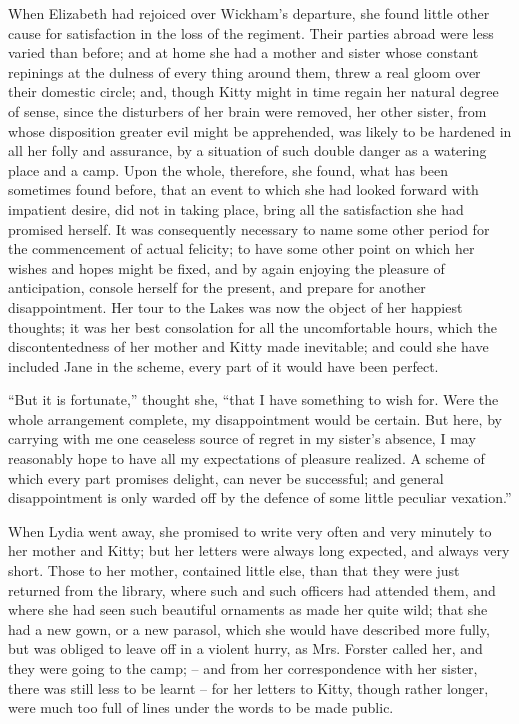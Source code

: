 When Elizabeth had rejoiced over Wickham’s departure,
she found little other cause for satisfaction in the loss of
the regiment. Their parties abroad were less varied than
before; and at home she had a mother and sister whose
constant repinings at the dulness of every thing around
them, threw a real gloom over their domestic circle;
and, though Kitty might in time regain her natural degree
of sense, since the disturbers of her brain were removed,
her other sister, from whose disposition greater evil might
be apprehended, was likely to be hardened in all her folly
and assurance, by a situation of such double danger as
a watering place and a camp. Upon the whole, therefore,
she found, what has been sometimes found before, that
an event to which she had looked forward with impatient
desire, did not in taking place, bring all the satisfaction
she had promised herself. It was consequently necessary
to name some other period for the commencement of
actual felicity; to have some other point on which her
wishes and hopes might be fixed, and by again enjoying
the pleasure of anticipation, console herself for the present,
and prepare for another disappointment. Her tour to
the Lakes was now the object of her happiest thoughts;
it was her best consolation for all the uncomfortable
hours, which the discontentedness of her mother and
Kitty made inevitable; and could she have included
Jane in the scheme, every part of it would have been
perfect.

“But it is fortunate,” thought she, “that I have something
to wish for. Were the whole arrangement complete,
my disappointment would be certain. But here, by
carrying with me one ceaseless source of regret in my
sister’s absence, I may reasonably hope to have all my
expectations of pleasure realized. A scheme of which
every part promises delight, can never be successful; and
general disappointment is only warded off by the defence
of some little peculiar vexation.”

When Lydia went away, she promised to write very
often and very minutely to her mother and Kitty; but
her letters were always long expected, and always very
short. Those to her mother, contained little else, than
that they were just returned from the library, where
such and such officers had attended them, and where she
had seen such beautiful ornaments as made her quite
wild; that she had a new gown, or a new parasol, which
she would have described more fully, but was obliged
to leave off in a violent hurry, as Mrs. Forster called her,
and they were going to the camp; -- and from her correspondence
with her sister, there was still less to be learnt -- for
her letters to Kitty, though rather longer, were much
too full of lines under the words to be made public.

